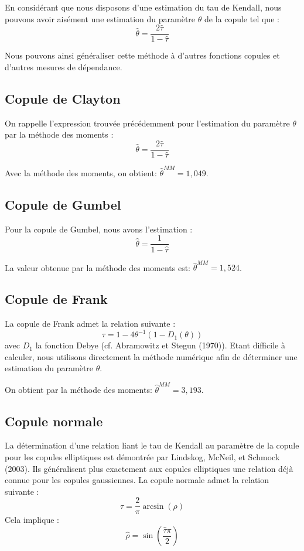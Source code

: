 En considérant que nous disposons d'une estimation du tau de Kendall, nous pouvons avoir aisément une estimation du paramètre $\theta$ de la copule tel que :
$$
\widehat{\theta} = \frac{2 \widehat{\tau}}{1 - \widehat{\tau}}
$$

Nous pouvons ainsi généraliser cette méthode à d’autres fonctions copules et d’autres mesures de dépendance.

\subsection{Copule de Clayton}

On rappelle l'expression trouvée précédemment pour l'estimation du paramètre $\theta$ par la méthode des moments :
$$
\widehat{\theta} = \frac{2 \widehat{\tau}}{1 - \widehat{\tau}}
$$

Avec la méthode des moments, on obtient: $\widehat{\theta}^{MM} = 1,049$.

\subsection{Copule de Gumbel}

Pour la copule de Gumbel, nous avons l'estimation :
$$
\widehat{\theta} = \frac{1}{1-\widehat{\tau}}
$$

La valeur obtenue par la méthode des moments est: $\widehat{\theta}^{MM} = 1,524$.

\subsection{Copule de Frank}

La copule de Frank admet la relation suivante :
$$
\tau = 1 - 4 \theta^{-1} (1-D_1(\theta))
$$
avec $D_1$ la fonction Debye (cf. Abramowitz et Stegun (1970)). Etant difficile à calculer, nous utilisons directement la méthode numérique 
afin de déterminer une estimation du paramètre $\theta$. 

On obtient par la méthode des moments: $\widehat{\theta}^{MM} = 3,193$.


\subsection{Copule normale}

La détermination d'une relation liant le tau de Kendall au paramètre de la copule pour les copules elliptiques est démontrée par Lindskog, McNeil,
et Schmock (2003). Ils généralisent plus exactement aux copules elliptiques une relation déjà connue
pour les copules gaussiennes. 
La copule normale admet la relation suivante :
$$
\tau = \frac{2}{\pi} \operatorname{arcsin}(\rho)
$$
Cela implique :
$$
\widehat{\rho} = \operatorname{sin}\left(\frac{\widehat{\tau} \pi}{2} \right)
$$

